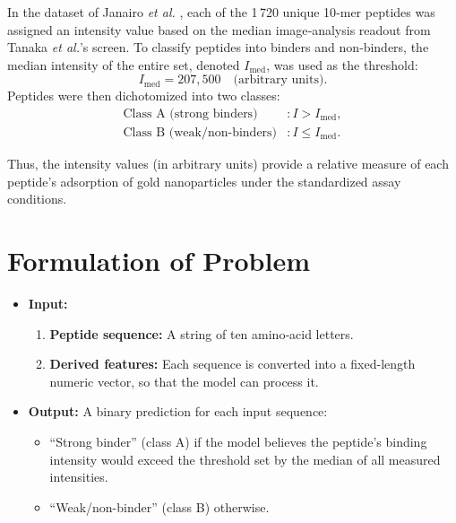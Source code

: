 \documentclass{article}
\begin{document}
In the dataset of Janairo \emph{et al.} \cite{janairo2022a}, each of the 1\,720 unique 10‐mer peptides was assigned an intensity value based on the median image‐analysis readout from Tanaka \emph{et al.}'s screen. To classify peptides into binders and non‐binders, the median intensity of the entire set, denoted \(I_{\mathrm{med}}\), was used as the threshold:
\[
I_{\mathrm{med}} = 207{,}500 \quad\text{(arbitrary units)}.
\]
Peptides were then dichotomized into two classes:
\begin{align*}
\text{Class A (strong binders)} &: I > I_{\mathrm{med}}, \\
\text{Class B (weak/non‐binders)} &: I \le I_{\mathrm{med}}.
\end{align*}

Thus, the intensity values (in arbitrary units) provide a relative measure of each peptide’s adsorption of gold nanoparticles under the standardized assay conditions.


\section{Formulation of Problem}
\begin{itemize}
    \item \textbf{Input:}\begin{enumerate}
        \item \textbf{Peptide sequence:} A string of ten amino‐acid letters.

        \item \textbf{Derived features:} Each sequence is converted into a fixed-length numeric vector, so that the model can process it.
    \end{enumerate}

    \item \textbf{Output:} A binary prediction for each input sequence:
    \begin{itemize}
        \item “Strong binder” (class A) if the model believes the peptide’s binding intensity would exceed the threshold set by the median of all measured intensities.
        \item “Weak/non-binder” (class B) otherwise.
    \end{itemize}
\end{itemize}
\end{document}
